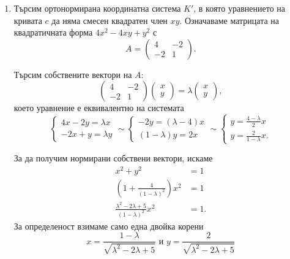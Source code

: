 \documentclass[numbers=endperiod, DIV=15]{scrartcl}
\begin{document}
\begin{solution}
  \begin{enumerate}
    \item Търсим ортонормирана координатна система $K'$, в която уравнението на кривата $c$ да няма смесен квадратен член $xy$. Означаваме матрицата на квадратичната форма $4x^2 - 4xy + y^2$ с
    \begin{displaymath}
      A = \begin{pmatrix}
        4 & -2 \\
        -2 & 1
      \end{pmatrix}.
    \end{displaymath}

    Търсим собствените вектори на $A$:
    \begin{displaymath}
      \begin{pmatrix}
        4 & -2 \\
        -2 & 1
      \end{pmatrix}
      \begin{pmatrix}
        x \\ y
      \end{pmatrix}
      =
      \lambda
      \begin{pmatrix}
        x \\ y
      \end{pmatrix},
    \end{displaymath}
    което уравнение е еквивалентно на системата
    \begin{equation}
      \label{ex:canon:eigen}
      \begin{cases}
        4x - 2y = \lambda x \\
        -2x + y = \lambda y
      \end{cases}
      \sim
      \begin{cases}
        -2y = (\lambda - 4) x \\
        (1 - \lambda) y = 2x
      \end{cases}
      \sim
      \begin{cases}
        y = \frac {4 - \lambda} 2 x \\
        y = \frac 2 {1 - \lambda} x.
      \end{cases}
    \end{equation}

    За да получим нормирани собствени вектори, искаме
    \begin{align*}
      x^2 + y^2 &= 1 \\
      \left(1 +  \frac 4 {{(1 - \lambda)}^2} \right) x^2 &= 1 \\
      \frac {\lambda^2 - 2\lambda + 5} {{(1 - \lambda)}^2} x^2 &= 1.
    \end{align*}
    За определеност взимаме само една двойка корени
    \begin{equation}
      \label{ex:canon:normed_eigen}
      x = \frac {1 - \lambda} {\sqrt{\lambda^2 - 2\lambda + 5}}
      \text{ и }
      y = \frac 2 {\sqrt{\lambda^2 - 2\lambda + 5}}
    \end{equation}


\end{enumerate}
\end{solution}
\end{document}
